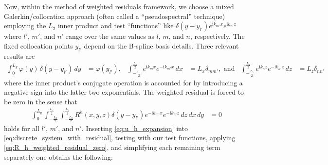 \documentclass[letterpaper,11pt,nointlimits,reqno,draft]{amsart}
\newcommand{\ii}{\ensuremath{\mathrm{i}}}
\begin{document}
Now, within the method of weighted residuals framework, we choose a mixed
Galerkin/collocation approach (often called a ``pseudospectral'' technique)
employing the $L_{2}$ inner product and test ``functions'' like
$\delta(y-y_{l'}) e^{\ii k_{m'} x}e^{\ii k_{n'} z}$ where $l'$, $m'$, and $n'$
range over the same values as $l$, $m$, and $n$, respectively.  The fixed
collocation points $y_{l'}$ depend on the B-spline basis details.  Three
relevant results are
\begin{align}
   \int_0^{L_y} \varphi(y) \, \delta(y-y_{l'}) \,d\!y
&= \varphi(y_{l'}),
&
   \int_{-\frac{L_x}{2}}^{\frac{L_x}{2}} e^{\ii k_m x} e^{-\ii k_{m'} x} \,d\!x
&= L_x \delta_{m m'}, \text{ and}
&
   \int_{-\frac{L_z}{2}}^{\frac{L_z}{2}} e^{\ii k_n z} e^{-\ii k_{n'} z} \,d\!z
&= L_z \delta_{n n'}
\end{align}
where the inner product's conjugate operation is accounted for by introducing a
negative sign into the latter two exponentials.  The weighted residual is
forced to be zero in the sense that
\begin{align}
  \int_0^{L_y}
  \int_{-\frac{L_x}{2}}^{\frac{L_x}{2}}
  \int_{-\frac{L_z}{2}}^{\frac{L_z}{2}}
  R^h\!\left(x,y,z\right) \delta(y-y_{l'}) e^{-\ii k_{m'} x}e^{-\ii k_{n'} z}
  \,d\!z \,d\!x \,d\!y
  &=
  0
  \label{eq:R_h_weighted_residual_zero}
\end{align}
holds for all $l'$, $m'$, and $n'$.  Inserting \eqref{eq:u_h_expansion} into
\eqref{eq:discrete_system_with_residual}, testing with our test functions,
applying \eqref{eq:R_h_weighted_residual_zero}, and simplifying each remaining
term separately one obtains the following:
\end{document}
